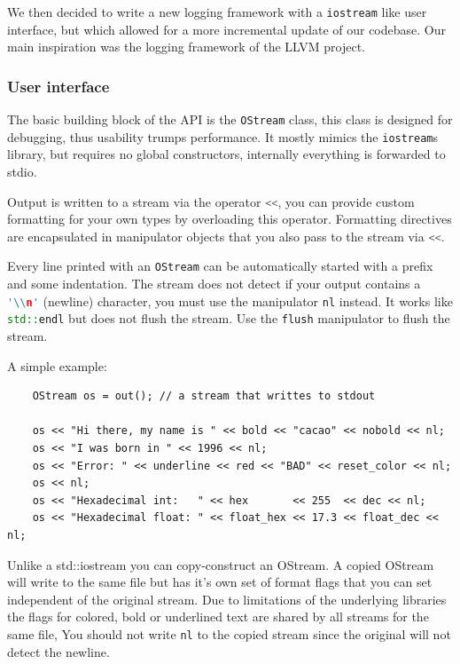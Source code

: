 \documentclass[12pt,a4paper,oneside]{article}
\newcommand{\cpp}[1]{\lstinline[language=C++]{#1}}
\begin{document}
	We then decided to write a new logging framework with a \cpp{iostream} like user interface, 
	but which allowed for a more incremental update of our codebase.
	Our main inspiration was the logging framework of the LLVM project\cite{llvm}.

\subsubsection{User interface}
	The basic building block of the API is the \cpp{OStream} class, 
	this class is designed for debugging, thus usability trumps performance.
	It mostly mimics the \cpp{iostream}s library, but requires no global constructors, 
	internally everything is forwarded to stdio.

	Output is written to a stream via the operator \cpp{<<}, you can provide custom formatting 
	for your own types by overloading this operator.
	Formatting directives are encapsulated in manipulator objects that you also pass to the stream
	via \cpp{<<}.

	Every line printed with an \cpp{OStream} can be automatically started with a prefix and some indentation.
	The stream does not detect if your output contains a \cpp{'\\n'} (newline) character,
	you must use the manipulator \cpp{nl} instead. 
	It works like \cpp{std::endl} but does not flush the stream. Use the \cpp{flush} manipulator to flush the stream.

	A simple example:
		\begin{lstlisting}
	OStream os = out(); // a stream that writtes to stdout

	os << "Hi there, my name is " << bold << "cacao" << nobold << nl;
	os << "I was born in " << 1996 << nl;
	os << "Error: " << underline << red << "BAD" << reset_color << nl;
	os << nl;
	os << "Hexadecimal int:   " << hex       << 255  << dec << nl;
	os << "Hexadecimal float: " << float_hex << 17.3 << float_dec << nl;
		\end{lstlisting}

	Unlike a std::iostream you can copy-construct an OStream.
	A copied OStream will write to the same file but has it's own set of
	format flags that you can set independent of the original stream.
	Due to limitations of the underlying libraries the flags for colored, bold or underlined text are shared by all streams for the same file,
	You should not write \cpp{nl} to the copied stream since the original will not
	detect the newline.
\end{document}
